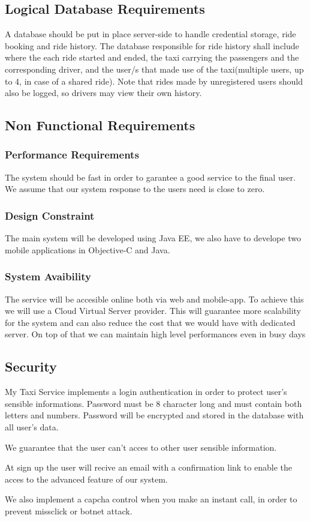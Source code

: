 \subsection{Logical Database Requirements}
	A database should be put in place server-side to handle credential storage, ride booking and ride history. The database responsible for ride history
	shall include where the each ride started and ended, the taxi carrying the passengers and the corresponding driver, and the user/s that made use of the
	taxi(multiple users, up to 4, in case of a shared ride). Note that rides made by unregistered users should also be logged, so drivers may view their own history.
\subsection {Non Functional Requirements}
 	\subsubsection{Performance Requirements}
 		The system should be fast in order to garantee a good service to the final user. We  assume that our system response to the users need is close to zero.
	\subsubsection {Design Constraint}
		The main system will be developed using Java EE, we also have to develope two mobile applications in
		Objective-C and Java.
	\subsubsection {System Avaibility}
		The service will be accesible online both via web and mobile-app. To achieve this we will use a Cloud Virtual Server provider. This will guarantee more scalability
		for the system and can also reduce the cost that we would have with dedicated server. On top of that we can maintain high level performances even in busy days
\subsection {Security}
	My Taxi Service implements a login authentication in order to protect user's sensible informations. Password must be 8 character long and must contain both letters
	and numbers. Password will be encrypted and stored in the database with all user's data.

	We guarantee that the user can't acces to other user sensible information.

	At sign up the user will recive an email with a confirmation link to enable the acces to the advanced feature of our system.

	We also implement a capcha control when you make an instant call, in order to prevent missclick or botnet attack.
